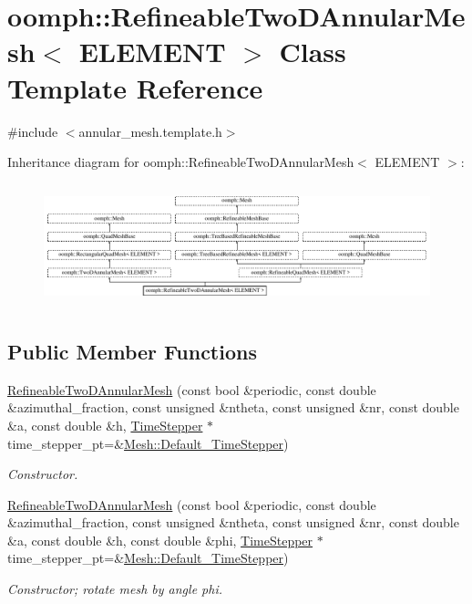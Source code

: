 \hypertarget{classoomph_1_1RefineableTwoDAnnularMesh}{}\section{oomph\+:\+:Refineable\+Two\+D\+Annular\+Mesh$<$ E\+L\+E\+M\+E\+NT $>$ Class Template Reference}
\label{classoomph_1_1RefineableTwoDAnnularMesh}


{\ttfamily \#include $<$annular\+\_\+mesh.\+template.\+h$>$}

Inheritance diagram for oomph\+:\+:Refineable\+Two\+D\+Annular\+Mesh$<$ E\+L\+E\+M\+E\+NT $>$\+:\begin{figure}[H]
\begin{center}
\leavevmode
\includegraphics[height=3.578275cm]{classoomph_1_1RefineableTwoDAnnularMesh}
\end{center}
\end{figure}
\subsection*{Public Member Functions}
\begin{DoxyCompactItemize}
\item 
\hyperlink{classoomph_1_1RefineableTwoDAnnularMesh_ae2ade4a5af04871f53de1906a428d6ff}{Refineable\+Two\+D\+Annular\+Mesh} (const bool \&periodic, const double \&azimuthal\+\_\+fraction, const unsigned \&ntheta, const unsigned \&nr, const double \&a, const double \&h, \hyperlink{classoomph_1_1TimeStepper}{Time\+Stepper} $\ast$time\+\_\+stepper\+\_\+pt=\&\hyperlink{classoomph_1_1Mesh_a12243d0fee2b1fcee729ee5a4777ea10}{Mesh\+::\+Default\+\_\+\+Time\+Stepper})
\begin{DoxyCompactList}\small\item\em Constructor. \end{DoxyCompactList}\item 
\hyperlink{classoomph_1_1RefineableTwoDAnnularMesh_a5efdb906168255f7264ee22a963d7eb6}{Refineable\+Two\+D\+Annular\+Mesh} (const bool \&periodic, const double \&azimuthal\+\_\+fraction, const unsigned \&ntheta, const unsigned \&nr, const double \&a, const double \&h, const double \&phi, \hyperlink{classoomph_1_1TimeStepper}{Time\+Stepper} $\ast$time\+\_\+stepper\+\_\+pt=\&\hyperlink{classoomph_1_1Mesh_a12243d0fee2b1fcee729ee5a4777ea10}{Mesh\+::\+Default\+\_\+\+Time\+Stepper})
\begin{DoxyCompactList}\small\item\em Constructor; rotate mesh by angle phi. \end{DoxyCompactList}\end{DoxyCompactItemize}
